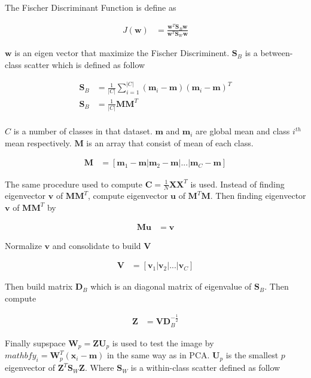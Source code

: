 \documentclass[11pt]{article}
\begin{document}
The Fischer Discriminant Function is define as 

\begin{align*}
J(\mathbf{w}) &= \frac{\mathbf{w}^T \mathbf{S}_B \mathbf{w}}{\mathbf{w}^T \mathbf{S}_W \mathbf{w}}
\end{align*}

$\mathbf{w}$ is an eigen vector that maximize the Fischer Discriminent. $\mathbf{S}_B$ is a between-class scatter which is defined as follow

\begin{align*}
\mathbf{S}_B &= \frac{1}{|C|} \sum_{i=1}^{|C|} (\mathbf{m}_i - \mathbf{m}) (\mathbf{m}_i - \mathbf{m})^T \\
\mathbf{S}_B &= \frac{1}{|C|} \mathbf{M} \mathbf{M}^T \\
\end{align*}

$C$ is a number of classes in that dataset. $\mathbf{m}$ and $\mathbf{m}_i$ are global mean and class $i^{th}$ mean respectively. $\mathbf{M}$ is an array that consist of mean of each class.

\begin{align*}
\mathbf{M} &= [\mathbf{m}_1 - \mathbf{m} | \mathbf{m}_2 - \mathbf{m} | ... | \mathbf{m}_C - \mathbf{m}]
\end{align*}

The same procedure used to compute $\mathbf{C} = \frac{1}{N} \mathbf{X}\mathbf{X}^T$ is used. Instead of finding eigenvector $\mathbf{v}$ of $\mathbf{M}\mathbf{M}^T$, compute  eigenvector $\mathbf{u}$ of $\mathbf{M}^T\mathbf{M}$. Then finding eigenvector $\mathbf{v}$ of $\mathbf{M}\mathbf{M}^T$ by 


\begin{align*}
 \mathbf{M} \mathbf{u} &= \mathbf{v}
\end{align*}

Normalize $\mathbf{v}$ and consolidate to build $\mathbf{V}$ 

\begin{align*}
\mathbf{V} &= [\mathbf{v}_1  | \mathbf{v}_2 | ... | \mathbf{v}_C ]
\end{align*}

Then build matrix $\mathbf{D}_B$ which is an diagonal matrix of eigenvalue of $\mathbf{S}_B$. Then compute 

\begin{align*}
 \mathbf{Z}  &= \mathbf{V}\mathbf{D}_B^{-\frac{1}{2}}
\end{align*}

Finally supspace $\mathbf{W}_p = \mathbf{Z}\mathbf{U}_p$ is used to test the image by $mathbf{y}_i = \mathbf{W}_p^T (\mathbf{x}_i - \mathbf{m})$  in the same way as in PCA. $\mathbf{U}_p$ is the smallest $p$ eigenvector of $\mathbf{Z}^T \mathbf{S}_W \mathbf{Z}$. Where $\mathbf{S}_W$ is a within-class scatter defined as follow
\end{document}
